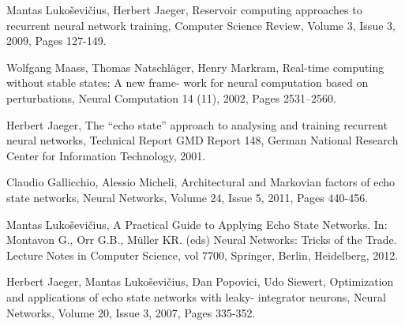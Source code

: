 Mantas Luko\v{s}evi\v{c}ius, Herbert Jaeger,
Reservoir computing approaches to recurrent neural network training,
Computer Science Review,
Volume 3, Issue 3,
2009,
Pages 127-149.

 Wolfgang Maass, Thomas Natschläger, Henry Markram,
Real-time computing without stable states: A new frame-
work for neural computation based on perturbations, Neural Computation 14 (11), 2002, Pages 2531–2560.

 Herbert Jaeger, The “echo state” approach to analysing
and training recurrent neural networks, Technical Report
GMD Report 148, German National Research Center for
Information Technology, 2001.

Claudio Gallicchio, Alessio Micheli,
Architectural and Markovian factors of echo state networks,
Neural Networks,
Volume 24, Issue 5,
2011,
Pages 440-456.

Mantas Lukoševičius, A Practical Guide to Applying Echo State Networks. In: Montavon G., Orr G.B., Müller KR. (eds) Neural Networks: Tricks of the Trade. Lecture Notes in Computer Science, vol 7700, Springer, Berlin, Heidelberg, 2012.

Herbert Jaeger, Mantas Lukoševičius, Dan Popovici, Udo Siewert,
Optimization and applications of echo state networks with leaky- integrator neurons,
Neural Networks,
Volume 20, Issue 3,
2007,
Pages 335-352.



